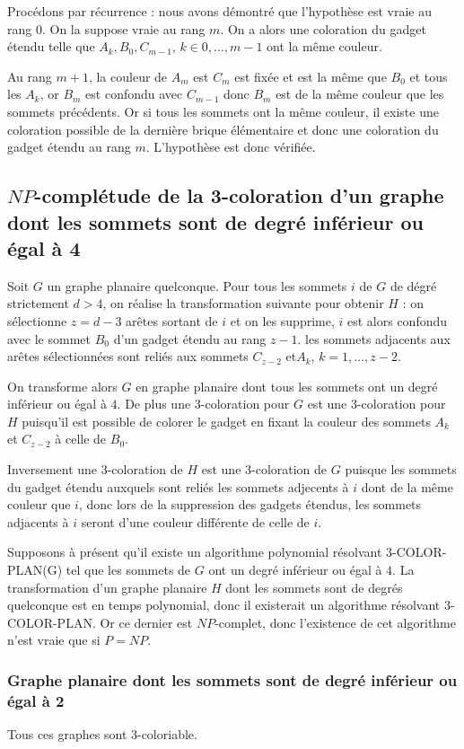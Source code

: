 Procédons par récurrence : nous avons démontré que l'hypothèse est vraie au rang $0$. On la suppose
vraie au rang $m$. On a alors une coloration du gadget étendu telle que $A_k, B_0, C_{m-1}$, $k \in
0, \dots, m-1$ ont la même couleur. 

Au rang $m+1$, la couleur de $A_m$ est $C_m$ est fixée et est la même que $B_0$ et tous les $A_k$,
or $B_m$ est confondu avec $C_{m-1}$ donc $B_m$ est de la même couleur que les sommets précédents.
Or si tous les sommets ont la même couleur, il existe une coloration possible de la dernière brique
élémentaire et donc une coloration du gadget étendu au rang $m$. L'hypothèse est donc vérifiée.

\subsection{$NP$-complétude de la 3-coloration d'un graphe dont les sommets sont de degré inférieur
ou égal à 4}

Soit $G$ un graphe planaire quelconque. Pour tous les sommets $i$ de $G$ de dégré strictement $d
>4$, on réalise la transformation suivante pour obtenir $H$ : on sélectionne $z = d-3$ arêtes sortant de
$i$ et on les supprime, $i$ est alors confondu avec le sommet $B_0$ d'un gadget étendu au rang $z-1$.
les sommets adjacents aux arêtes sélectionnées sont reliés aux sommets $C_{z-2}$ et$A_k$, $k=1, \dots,
z-2$.

On transforme alors $G$ en graphe planaire dont tous les sommets ont un degré inférieur ou égal à
$4$. De plus une 3-coloration pour $G$ est une 3-coloration pour $H$ puisqu'il est possible de colorer
le gadget en fixant la couleur des sommets $A_k$ et $C_{z-2}$ à celle de $B_0$.

Inversement une 3-coloration de $H$ est une 3-coloration de $G$ puisque les sommets du gadget étendu
auxquels sont reliés les sommets adjecents à $i$ dont de la même couleur que $i$, donc lors de la
suppression des gadgets étendus, les sommets adjacents à $i$ seront d'une couleur différente de
celle de $i$.

Supposons à présent qu'il existe un algorithme polynomial résolvant 3-COLOR-PLAN(G) tel que les
sommets de $G$ ont un degré inférieur ou égal à $4$. La transformation d'un graphe planaire $H$ dont
les sommets sont de degrés quelconque est en temps polynomial, donc il existerait un algorithme
résolvant 3-COLOR-PLAN. Or ce dernier est $NP$-complet, donc l'existence de cet algorithme n'est
vraie que si $P = NP$.

\subsubsection{Graphe planaire dont les sommets sont de degré inférieur ou égal à 2}

Tous ces graphes sont 3-coloriable.
